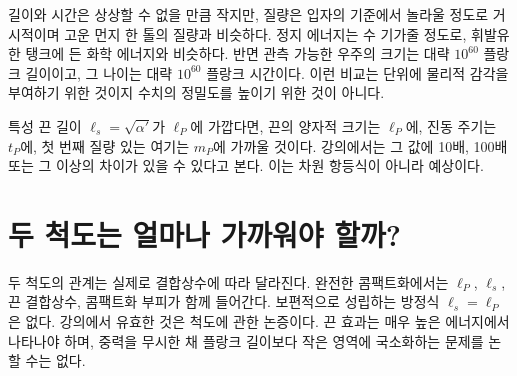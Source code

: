 길이와 시간은 상상할 수 없을 만큼 작지만, 질량은 입자의 기준에서 놀라울 정도로 거시적이며 고운 먼지 한 톨의 질량과 비슷하다. 정지 에너지는 수 기가줄 정도로, 휘발유 한 탱크에 든 화학 에너지와 비슷하다. 반면 관측 가능한 우주의 크기는 대략 \(10^{60}\) 플랑크 길이이고, 그 나이는 대략 \(10^{60}\) 플랑크 시간이다. 이런 비교는 단위에 물리적 감각을 부여하기 위한 것이지 수치의 정밀도를 높이기 위한 것이 아니다.

특성 끈 길이 \(\ell_s=\sqrt{\alpha'}\)가 \(\ell_P\)에 가깝다면, 끈의 양자적 크기는 \(\ell_P\)에, 진동 주기는 \(t_P\)에, 첫 번째 질량 있는 여기는 \(m_P\)에 가까울 것이다. 강의에서는 그 값에 10배, 100배 또는 그 이상의 차이가 있을 수 있다고 본다. 이는 차원 항등식이 아니라 예상이다.

\begin{classroomqa}\end{classroomqa}

\section{두 척도는 얼마나 가까워야 할까?}

\begin{classroomqa}\end{classroomqa}

두 척도의 관계는 실제로 결합상수에 따라 달라진다. 완전한 콤팩트화에서는 \(\ell_P\), \(\ell_s\), 끈 결합상수, 콤팩트화 부피가 함께 들어간다. 보편적으로 성립하는 방정식 \(\ell_s=\ell_P\)은 없다. 강의에서 유효한 것은 척도에 관한 논증이다. 끈 효과는 매우 높은 에너지에서 나타나야 하며, 중력을 무시한 채 플랑크 길이보다 작은 영역에 국소화하는 문제를 논할 수는 없다.

